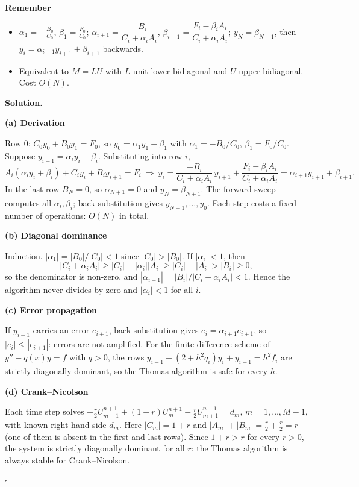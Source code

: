 \documentclass[11pt,a4paper]{article}
\newenvironment{rem}
  {\begin{remember}\noindent\textbf{Remember}\par\nobreak\vspace{-0.3em}}
  {\end{remember}}
\newenvironment{solution}
  {\par\noindent\textbf{Solution.}\par\nobreak}
  {\par\nobreak\noindent\hfill\(\square\)\par}
\newcommand{\step}[1]{\par\addvspace{0.5em}\noindent\textbf{#1}\par\nobreak}
\begin{document}
\begin{rem}
\begin{itemize}
  \item \(\alpha_1=-\frac{B_0}{C_0}\), \(\beta_1=\frac{F_0}{C_0}\);
    \(\alpha_{i+1}=\dfrac{-B_i}{C_i+\alpha_iA_i}\),
    \(\beta_{i+1}=\dfrac{F_i-\beta_iA_i}{C_i+\alpha_iA_i}\);
    \(y_N=\beta_{N+1}\), then \(y_i=\alpha_{i+1}y_{i+1}+\beta_{i+1}\)
    backwards.
  \item Equivalent to \(M=LU\) with \(L\) unit lower bidiagonal and
    \(U\) upper bidiagonal.  Cost \(O(N)\).
\end{itemize}
\end{rem}

\begin{solution}
\step{(a) Derivation}
Row \(0\): \(C_0y_0+B_0y_1=F_0\), so \(y_0=\alpha_1y_1+\beta_1\) with
\(\alpha_1=-B_0/C_0\), \(\beta_1=F_0/C_0\).  Suppose
\(y_{i-1}=\alpha_iy_i+\beta_i\).  Substituting into row \(i\),
\[
  A_i(\alpha_iy_i+\beta_i)+C_iy_i+B_iy_{i+1}=F_i
  \ \Longrightarrow\
  y_i=\frac{-B_i}{C_i+\alpha_iA_i}\,y_{i+1}+\frac{F_i-\beta_iA_i}{C_i+\alpha_iA_i}
  =\alpha_{i+1}y_{i+1}+\beta_{i+1}.
\]
In the last row \(B_N=0\), so \(\alpha_{N+1}=0\) and
\(y_N=\beta_{N+1}\).  The forward sweep computes all
\(\alpha_i,\beta_i\); back substitution gives
\(y_{N-1},\dots,y_0\).  Each step costs a fixed number of operations:
\(O(N)\) in total.

\step{(b) Diagonal dominance}
Induction.  \(|\alpha_1|=|B_0|/|C_0|<1\) since \(|C_0|>|B_0|\).  If
\(|\alpha_i|<1\), then
\[
  |C_i+\alpha_iA_i|\ge|C_i|-|\alpha_i||A_i|\ge|C_i|-|A_i|>|B_i|\ge0,
\]
so the denominator is non-zero, and
\(|\alpha_{i+1}|=|B_i|/|C_i+\alpha_iA_i|<1\).  Hence the algorithm
never divides by zero and \(|\alpha_i|<1\) for all \(i\).

\step{(c) Error propagation}
If \(y_{i+1}\) carries an error \(e_{i+1}\), back substitution gives
\(e_i=\alpha_{i+1}e_{i+1}\), so \(|e_i|\le|e_{i+1}|\): errors are not
amplified.  For the finite difference scheme of
\(y''-q(x)y=f\) with \(q>0\), the rows
\(y_{i-1}-(2+h^2q_i)y_i+y_{i+1}=h^2f_i\) are strictly diagonally
dominant, so the Thomas algorithm is safe for every \(h\).

\step{(d) Crank--Nicolson}
Each time step solves
\(-\frac r2U_{m-1}^{n+1}+(1+r)U_m^{n+1}-\frac r2U_{m+1}^{n+1}=d_m\),
\(m=1,\dots,M-1\), with known right-hand side \(d_m\).  Here
\(|C_m|=1+r\) and \(|A_m|+|B_m|=\frac r2+\frac r2=r\) (one of them is
absent in the first and last rows).  Since \(1+r>r\) for every
\(r>0\), the system is strictly diagonally dominant for all \(r\): the
Thomas algorithm is always stable for Crank--Nicolson.
\end{solution}
\end{document}
